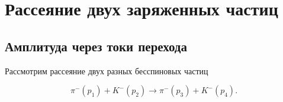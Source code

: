 \documentclass[../final.tex]{subfiles}
\begin{document}
\ifSubfilesClassLoaded{\setcounter{chapter}{2}\setcounter{section}{5}}{}



\section{Рассеяние двух заряженных частиц}

\subsection{Амплитуда через токи перехода}

Рассмотрим рассеяние двух разных бесспиновых частиц

\begin{equation*}
    \pi^-(p_1)+K^-(p_2)\rightarrow\pi^-(p_3)+K^-(p_4).
\end{equation*}
\end{document}

